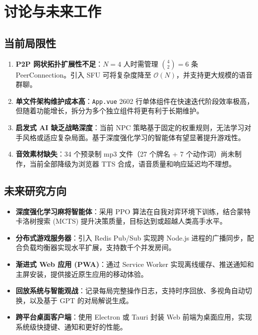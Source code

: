 \documentclass[11pt,a4paper]{article}
\begin{document}
\newpage
\section{讨论与未来工作}

\subsection{当前局限性}

\begin{enumerate}[nosep]
  \item \textbf{P2P 网状拓扑扩展性不足}：$N=4$ 人时需管理 $\binom{4}{2}=6$ 条 PeerConnection。引入 SFU 可将复杂度降至 $\mathcal{O}(N)$，并支持更大规模的语音群聊。
  \item \textbf{单文件架构维护成本高}：\texttt{App.vue} 2602 行单体组件在快速迭代阶段效率极高，但随着功能增长，拆分为多个独立组件将更有利于长期维护。
  \item \textbf{启发式 AI 缺乏战略深度}：当前 NPC 策略基于固定的权重规则，无法学习对手风格或适应复杂局面。基于深度强化学习的智能体有望显著提升游戏性。
  \item \textbf{音效素材缺失}：34 个预录制 mp3 文件（27 个牌名 + 7 个动作词）尚未制作，当前全部降级为浏览器 TTS 合成，语音质量和响应延迟均不理想。
\end{enumerate}

\subsection{未来研究方向}

\begin{itemize}[nosep]
  \item \textbf{深度强化学习麻将智能体}：采用 PPO 算法在自我对弈环境下训练，结合蒙特卡洛树搜索 (MCTS) 提升决策质量，目标达到或超越人类高手水平。
  \item \textbf{分布式游戏服务器}：引入 Redis Pub/Sub 实现跨 Node.js 进程的广播同步，配合负载均衡器实现水平扩展，支持数千个并发房间。
  \item \textbf{渐进式 Web 应用 (PWA)}：通过 Service Worker 实现离线缓存、推送通知和主屏安装，提供接近原生应用的移动体验。
  \item \textbf{回放系统与智能观战}：记录每局完整操作日志，支持时序回放、多视角自动切换，以及基于 GPT 的对局解说生成。
  \item \textbf{跨平台桌面客户端}：使用 Electron 或 Tauri 封装 Web 前端为桌面应用，实现系统级快捷键、通知和更好的性能。
\end{itemize}
\end{document}
